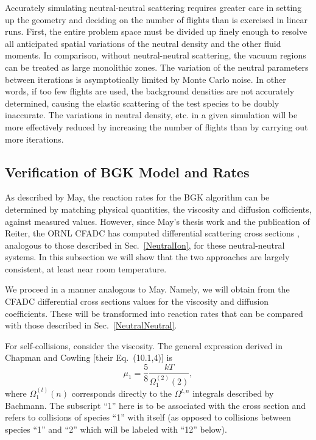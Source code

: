 \documentclass[12pt]{report}
\begin{document}
Accurately simulating neutral-neutral scattering requires greater care
in setting up the geometry and deciding on the number of flights than
is exercised in linear runs. First,
the entire problem space must be divided up finely enough to resolve all
anticipated spatial variations of the neutral density
and the other fluid moments. In comparison, 
without neutral-neutral
scattering, the vacuum regions can be treated as large monolithic zones.
The variation of the neutral parameters between iterations is asymptotically
limited by Monte Carlo noise. In other words, if too few flights are used,
the background densities are not accurately determined, causing the
elastic scattering of the test species to be doubly inaccurate.
The variations in neutral density, etc. in a given simulation will be more
effectively reduced by increasing the number of flights than by 
carrying out more iterations.

\subsection{Verification of BGK Model and Rates}
\label{BGKRates}

As described by May\cite{Mayxx}, the reaction rates for the BGK algorithm
can be determined by matching physical quantities, the viscosity and
diffusion cofficients, against measured values. However, since May's thesis
work and the publication of Reiter\cite{Reit97}, the ORNL 
CFADC has
computed differential scattering cross sections \cite{Krst98}, 
analogous to those
described in Sec.~\ref{NeutralIon}, for these neutral-neutral systems.
In this subsection we will show that the two approaches are largely
consistent, at least near room temperature.

We proceed in a manner analogous to May. Namely, we will obtain from the
CFADC differential cross sections values for the viscosity and diffusion
coefficients. These will be transformed
into reaction rates that can be compared with those described in 
Sec.~\ref{NeutralNeutral}.

For self-collisions, consider the viscosity. The general expression 
derived in Chapman and Cowling\cite{Chap70} [their Eq.~(10.1,4)] is
\begin{equation}
\mu_{1} = \frac{5}{8} \frac{k T}{\Omega_{1}^{(2)}(2)},
\label{visc1}
\end{equation}
where $\Omega_{1}^{(l)}{(n)}$ corresponds directly to the $\Omega^{l,n}$
integrals described by Bachmann\cite{Bach95}.  The subscript ``1'' here 
is to be associated with the cross section and refers to collisions of species 
``1'' with itself (as opposed to collisions between species ``1'' and 
``2'' which will be labeled with ``12'' below).
\end{document}
